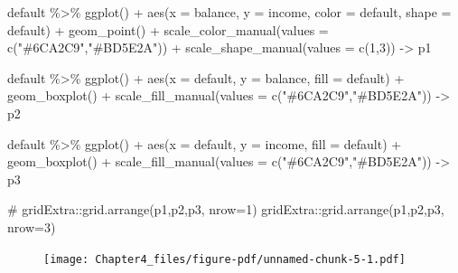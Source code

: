 \documentclass[
  letterpaper,
  DIV=11,
  numbers=noendperiod]{scrreprt}
\newenvironment{Shaded}{\begin{snugshade}}{\end{snugshade}}
\newcommand{\AttributeTok}[1]{\textcolor[rgb]{0.65,0.35,0.00}{#1}}
\newcommand{\CommentTok}[1]{\textcolor[rgb]{0.41,0.41,0.41}{#1}}
\newcommand{\DecValTok}[1]{\textcolor[rgb]{0.47,0.16,0.63}{#1}}
\newcommand{\FunctionTok}[1]{\textcolor[rgb]{0.02,0.16,0.49}{#1}}
\newcommand{\NormalTok}[1]{\textcolor[rgb]{0.33,0.33,0.33}{#1}}
\newcommand{\OtherTok}[1]{\textcolor[rgb]{0.85,0.12,0.09}{#1}}
\newcommand{\SpecialCharTok}[1]{\textcolor[rgb]{0.00,0.46,0.62}{#1}}
\newcommand{\StringTok}[1]{\textcolor[rgb]{0.00,0.50,0.00}{#1}}
\begin{document}
\begin{Shaded}
\begin{Highlighting}[]
\NormalTok{default }\SpecialCharTok{\%\textgreater{}\%} 
  \FunctionTok{ggplot}\NormalTok{() }\SpecialCharTok{+} \FunctionTok{aes}\NormalTok{(}\AttributeTok{x =}\NormalTok{ balance, }\AttributeTok{y =}\NormalTok{ income, }\AttributeTok{color =}\NormalTok{ default, }\AttributeTok{shape =}\NormalTok{ default) }\SpecialCharTok{+} \FunctionTok{geom\_point}\NormalTok{() }\SpecialCharTok{+} \FunctionTok{scale\_color\_manual}\NormalTok{(}\AttributeTok{values =} \FunctionTok{c}\NormalTok{(}\StringTok{"\#6CA2C9"}\NormalTok{,}\StringTok{"\#BD5E2A"}\NormalTok{)) }\SpecialCharTok{+} \FunctionTok{scale\_shape\_manual}\NormalTok{(}\AttributeTok{values =} \FunctionTok{c}\NormalTok{(}\DecValTok{1}\NormalTok{,}\DecValTok{3}\NormalTok{)) }\OtherTok{{-}\textgreater{}}\NormalTok{ p1}

\NormalTok{default }\SpecialCharTok{\%\textgreater{}\%} 
  \FunctionTok{ggplot}\NormalTok{() }\SpecialCharTok{+} \FunctionTok{aes}\NormalTok{(}\AttributeTok{x =}\NormalTok{ default, }\AttributeTok{y =}\NormalTok{ balance, }\AttributeTok{fill =}\NormalTok{ default) }\SpecialCharTok{+} \FunctionTok{geom\_boxplot}\NormalTok{() }\SpecialCharTok{+} 
  \FunctionTok{scale\_fill\_manual}\NormalTok{(}\AttributeTok{values =} \FunctionTok{c}\NormalTok{(}\StringTok{"\#6CA2C9"}\NormalTok{,}\StringTok{"\#BD5E2A"}\NormalTok{)) }\OtherTok{{-}\textgreater{}}\NormalTok{ p2}

\NormalTok{default }\SpecialCharTok{\%\textgreater{}\%} 
  \FunctionTok{ggplot}\NormalTok{() }\SpecialCharTok{+} \FunctionTok{aes}\NormalTok{(}\AttributeTok{x =}\NormalTok{ default, }\AttributeTok{y =}\NormalTok{ income, }\AttributeTok{fill =}\NormalTok{ default) }\SpecialCharTok{+} \FunctionTok{geom\_boxplot}\NormalTok{() }\SpecialCharTok{+} 
  \FunctionTok{scale\_fill\_manual}\NormalTok{(}\AttributeTok{values =} \FunctionTok{c}\NormalTok{(}\StringTok{"\#6CA2C9"}\NormalTok{,}\StringTok{"\#BD5E2A"}\NormalTok{)) }\OtherTok{{-}\textgreater{}}\NormalTok{ p3}

\CommentTok{\# gridExtra::grid.arrange(p1,p2,p3, nrow=1)}
\NormalTok{gridExtra}\SpecialCharTok{::}\FunctionTok{grid.arrange}\NormalTok{(p1,p2,p3, }\AttributeTok{nrow=}\DecValTok{3}\NormalTok{)}
\end{Highlighting}
\end{Shaded}

\begin{figure}[H]

{\centering \texttt{[image: Chapter4\_files/figure-pdf/unnamed-chunk-5-1.pdf]}

}

\end{figure}
\end{document}
